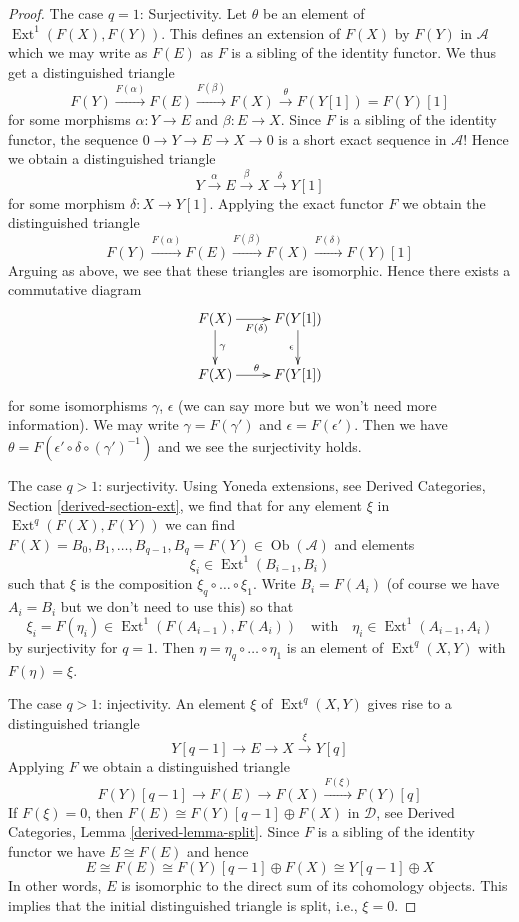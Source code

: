 \documentclass{stacks-project}
\theoremstyle{plain}
\theoremstyle{definition}
\theoremstyle{remark}
\numberwithin{equation}{subsection}
\def\Ext{\mathop{\mathrm{Ext}}\nolimits}
\def\Ob{\mathop{\mathrm{Ob}}\nolimits}
\begin{document}
\begin{proof}
\medskip\noindent
The case $q = 1$: Surjectivity. Let $\theta$ be an element of
$\Ext^1(F(X), F(Y))$. This defines an extension of $F(X)$ by $F(Y)$
in $\mathcal{A}$ which we may write as $F(E)$
as $F$ is a sibling of the identity functor. We thus get a distinguished
triangle
$$
F(Y) \xrightarrow{F(\alpha)} F(E)
\xrightarrow{F(\beta)} F(X)
\xrightarrow{\theta} F(Y[1]) = F(Y)[1]
$$
for some morphisms $\alpha : Y \to E$ and $\beta : E \to X$.
Since $F$ is a sibling of the identity functor, the sequence
$0 \to Y \to E \to X \to 0$
is a short exact sequence in $\mathcal{A}$! Hence we obtain a
distinguished triangle
$$
Y \xrightarrow{\alpha} E \xrightarrow{\beta} X \xrightarrow{\delta} Y[1]
$$
for some morphism $\delta : X \to Y[1]$. Applying the exact functor
$F$ we obtain the distinguished triangle
$$
F(Y) \xrightarrow{F(\alpha)} F(E) \xrightarrow{F(\beta)} F(X)
\xrightarrow{F(\delta)} F(Y)[1]
$$
Arguing as above, we see that these triangles are isomorphic.
Hence there exists a commutative diagram
$$
\xymatrix{
F(X) \ar[d]^\gamma \ar[r]_{F(\delta)} & F(Y[1]) \ar[d]_\epsilon \\
F(X) \ar[r]^\theta & F(Y[1])
}
$$
for some isomorphisms $\gamma$, $\epsilon$ (we can say more but we won't
need more information). We may write $\gamma = F(\gamma')$ and
$\epsilon = F(\epsilon')$. Then we have
$\theta = F(\epsilon' \circ \delta \circ (\gamma')^{-1})$
and we see the surjectivity holds.

\medskip\noindent
The case $q > 1$: surjectivity. Using Yoneda extensions, see
Derived Categories, Section \ref{derived-section-ext}, we find that for any
element $\xi$ in $\Ext^q(F(X), F(Y))$ we can find
$F(X) = B_0, B_1, \ldots, B_{q - 1}, B_q = F(Y) \in \Ob(\mathcal{A})$ and
elements
$$
\xi_i \in \Ext^1(B_{i - 1}, B_i)
$$
such that $\xi$ is the composition $\xi_q \circ \ldots \circ \xi_1$.
Write $B_i = F(A_i)$ (of course we have $A_i = B_i$ but we don't
need to use this) so that
$$
\xi_i = F(\eta_i) \in \Ext^1(F(A_{i - 1}), F(A_i))
\quad\text{with}\quad
\eta_i \in \Ext^1(A_{i - 1}, A_i)
$$
by surjectivity for $q = 1$. Then $\eta = \eta_q \circ \ldots \circ \eta_1$
is an element of $\Ext^q(X, Y)$ with $F(\eta) = \xi$.

\medskip\noindent
The case $q > 1$: injectivity. An element $\xi$ of $\Ext^q(X, Y)$
gives rise to a distinguished triangle
$$
Y[q - 1] \to E \to X \xrightarrow{\xi} Y[q]
$$
Applying $F$ we obtain a distinguished triangle
$$
F(Y)[q - 1] \to F(E) \to F(X) \xrightarrow{F(\xi)} F(Y)[q]
$$
If $F(\xi) = 0$, then $F(E) \cong F(Y)[q - 1] \oplus F(X)$
in $\mathcal{D}$, see
Derived Categories, Lemma \ref{derived-lemma-split}.
Since $F$ is a sibling of the identity functor we have
$E \cong F(E)$ and hence
$$
E \cong F(E) \cong F(Y)[q - 1] \oplus F(X) \cong Y[q - 1] \oplus X
$$
In other words, $E$ is isomorphic to the
direct sum of its cohomology objects. This implies that the
initial distinguished triangle is split, i.e., $\xi = 0$.
\end{proof}
\end{document}
